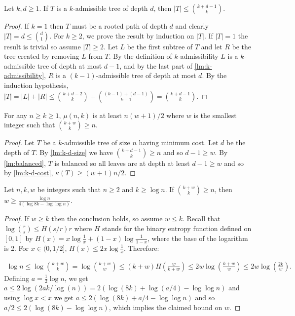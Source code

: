 \documentclass[unicode,review]{siamart1116}
\numberwithin{theorem}{section}
\begin{document}
\begin{lemma}
\label{lm:k-d-size}
Let $k,d \geq 1$. If $T$ is a $k$-admissible tree of depth $d$,
then $|T| \leq \binom{k + d - 1}{k}$.
\end{lemma}
\begin{proof}
If $k=1$ then $T$ must be a rooted path of depth $d$ and clearly $|T|=d\le \binom{d}{1}$. 
For $k\ge 2$, we prove the result by induction on $|T|$.  If $|T|=1$ the result is trivial so
assume $|T| \geq 2$.  Let $L$ be the first subtree of $T$ and let $R$ be the tree created by removing $L$ from $T$. By the definition of $k$-admissibility
$L$ is a $k$-admissible tree of depth at most $d-1$, and by the last part of
\cref{lm:k-admissibility}, $R$ is a $(k-1)$-admissible tree of depth at most $d$.
By the induction hypothesis, $|T| = |L| + |R| \leq \binom{k + d - 2}{k} + \binom{(k-1) + (d - 1)}{k - 1} = \binom{k + d - 1}{k}$.
\end{proof}





\begin{corollary}
\label{cor:mu}
For any $n \geq k \geq 1$, $\mu(n,k)$ is at least $n(w+1)/2$ 
where $w$ is the smallest integer such that $\binom{k+w}{k} \geq n$.
\end{corollary}

\begin{proof}
Let $T$ be a $k$-admissible tree of size $n$ having minimum cost.  Let $d$ be the depth of $T$.
By \cref{lm:k-d-size} we have
$\binom{k+d-1}{k} \geq n$ and so $d-1 \geq w$.
By \cref{lm:balanced}, $T$ is balanced so all leaves are at depth at least $d-1\geq w$ and so
by \cref{lm:k-d-cost}, $\kappa(T) \geq (w+1)n/2$.  
\end{proof}

\begin{lemma} \label{lm:lower_bound_d}
Let $n,k,w$ be integers such that $n\ge 2$ and $k \ge \log n$.  If $\binom{k+w}{k} \geq n$,
then $w \ge \frac{\log n}{ 4 (\log 8k - \log\log n)}$.
\end{lemma}
\begin{proof}
If $w \geq k$ then the conclusion holds, so assume $w \leq k$.
Recall that $\log\binom{r}{s} \leq {H(s/r) r}$
where $H$ stands for the binary entropy function
defined on $[0,1]$ by $H(x) = x \log\frac{1}{x} + (1-x) \log\frac{1}{1-x}$, where the base of the logarithm is 2.
For $x \in (0,1/2]$, $H(x) \le 2x \log\frac{1}{x}$. Therefore:

\begin{align*}
	\log n \leq \log{\binom{k+w}{k}} 
	= \log {\binom{k+w}{w}}
	\leq (k+w)H\left(\frac{w}{k + w}\right)
	\leq 2w\log\left(\frac{k + w}{w}\right)
	\leq 2w\log\left(\frac{2k}{w}\right).
\end{align*}
Defining $a=\frac{1}{2}\log n$, we get $a \leq 2\log(2ak/\log(n))=2(\log(8k)+\log(a/4)-\log\log n)$
and using $\log x<x$ we get $a \leq 2(\log(8k)+a/4 -\log\log n)$ and so $a/2 \leq 2(\log(8k)-\log\log n)$, which
implies the claimed bound on $w$.
\end{proof}
\end{document}
